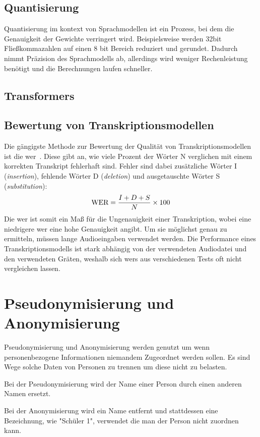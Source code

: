 \subsection{Quantisierung}
Quantisierung im kontext von Sprachmodellen ist ein Prozess, bei dem die Genauigkeit der Gewichte verringert wird.
Beispielsweise werden 32bit Fließkommazahlen auf einen 8 bit Bereich reduziert und gerundet.
Dadurch nimmt Präzision des Sprachmodells ab, allerdings wird weniger Rechenleistung benötigt und die Berechnungen laufen schneller.

\subsection{Transformers}
\subsection{Bewertung von Transkriptionsmodellen}
Die gängigste Methode zur Bewertung der Qualität von Transkriptionsmodellen ist die \ac{wer}~\citep{wer}.
Diese gibt an, wie viele Prozent der Wörter N verglichen mit einem korrekten Transkript fehlerhaft sind.
Fehler sind dabei zusätzliche Wörter I (\textit{insertion}), fehlende Wörter D (\textit{deletion}) und ausgetauschte Wörter S (\textit{substitution}):
\[\textnormal{WER} = \frac{I + D + S}{N} \times 100\]
Die \ac{wer} ist somit ein Maß für die Ungenauigkeit einer Transkription, wobei eine niedrigere \ac{wer} eine hohe Genauigkeit angibt.
Um sie möglichst genau zu ermitteln, müssen lange Audioeingaben verwendet werden.
Die Performance eines Transkriptionsmodells ist stark abhängig von der verwendeten Audiodatei und den verwendeten Gräten, weshalb sich \acp{wer} aus verschiedenen Tests oft nicht vergleichen lassen.

\section{Pseudonymisierung und Anonymisierung}
Pseudonymisierung und Anonymisierung werden genutzt um wenn personenbezogene Informationen niemandem Zugeordnet werden sollen.
Es sind Wege solche Daten von Personen zu trennen um diese nicht zu belasten.

\begin{definition}[Pseudonymisierung]
Bei der Pseudonymisierung wird der Name einer Person durch einen anderen Namen ersetzt.
\end{definition}

\begin{definition}[Anonymisierung]
Bei der Anonymisierung wird ein Name entfernt und stattdessen eine Bezeichnung, wie "Schüler 1", verwendet die man der Person nicht zuordnen kann.
\end{definition}